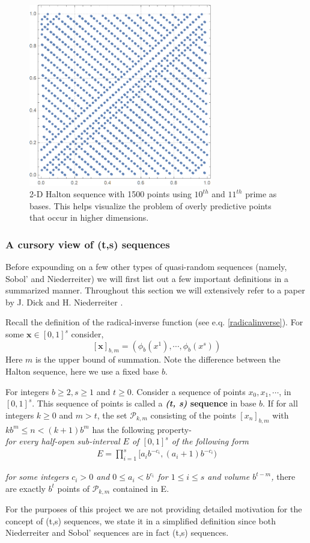 \documentclass[12pt]{article}
\numberwithin{equation}{section}
\begin{document}
\begin{figure}[!htb]
    \centering
    \includegraphics[width=8cm]{Images/1011halton.png}
    \caption{2-D Halton sequence with 1500 points using $10^{th}$ and $11^{th}$ prime as bases. This helps visualize the problem of overly predictive points that occur in higher dimensions.}
    \label{fig:example1011halton}
\end{figure}
\clearpage
\subsubsection{A cursory view of (t,s) sequences}

Before expounding on a few other types of quasi-random sequences (namely, Sobol' and Niederreiter) we will first list out a few important definitions in a summarized manner. Throughout this section we will extensively refer to a paper by J. Dick and H. Niederreiter \cite{exactnied}.
\par Recall the definition of the radical-inverse function (see e.q. \ref{radicalinverse}). For some $\mathbf{x} \in [0,1]^s$ consider, $$[\mathbf{x}]_{b, m}=(\phi_b(x^1), \cdots, \phi_b(x^s))$$ Here $m$ is the upper bound of summation. Note the difference between the Halton sequence, here we use a fixed base $b$.
\par For integers $b\geq 2, s\geq 1$ and $t \geq 0$. Consider a sequence of points $x_0, x_1, \cdots$, in $[0,1]^s$. This sequence of points is called a \textbf{\textit{(t, s)} sequence} in base $b$. If for all integers $k\geq0$ and $m > t$, the set $\mathcal{P}_{k,m}$ consisting of the points $[x_n]_{b,m}$ with $kb^m \leq n < (k+1)b^m$ has the following property-
\\
\textit{for every half-open sub-interval $E$ of $[0,1]^s$ of the following form}
\begin{align}
    E= \prod_{i=1}^s [a_i b^{-c_i}, (a_i+1)b^{-c_i}) \label{elementary}
\end{align}
\par \textit{for some integers $c_i>0$ and $0\leq a_i < b^{c_i}$ for $1\leq i \leq s$ and volume $b^{t-m}$,} there are exactly $b^t$ points of $\mathcal{P}_{k,m}$ contained in E.
\par For the purposes of this project we are not providing detailed motivation for the concept of (t,s) sequences, we state it in a simplified definition since both Niederreiter and Sobol' sequences are in fact (t,s) sequences.
\end{document}
